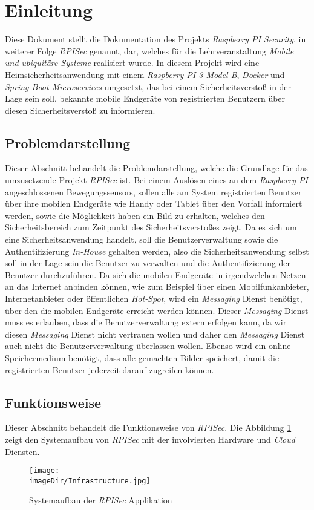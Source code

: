 \section{Einleitung}
Diese Dokument stellt die Dokumentation des Projekts \emph{Raspberry PI Security}, in weiterer Folge \emph{RPISec} genannt, dar, welches für die Lehrveranstaltung \emph{Mobile und ubiquitäre Systeme} realisiert wurde. In diesem Projekt wird eine Heimsicherheitsanwendung mit einem \emph{Raspberry PI 3 Model B}, \emph{Docker} und \emph{Spring Boot Microservices} umgesetzt, das bei einem Sicherheitsverstoß in der Lage sein soll, bekannte mobile Endgeräte von registrierten Benutzern über diesen Sicherheitsverstoß zu informieren. 

\subsection{Problemdarstellung}
Dieser Abschnitt behandelt die Problemdarstellung, welche die Grundlage für das umzusetzende Projekt \emph{RPISec} ist. Bei einem Auslösen eines an dem \emph{Raspberry PI} angeschlossenen Bewegungssensors,  sollen alle am System registrierten Benutzer über ihre mobilen Endgeräte wie Handy oder Tablet über den Vorfall informiert werden, sowie die Möglichkeit haben ein Bild zu erhalten, welches den Sicherheitsbereich zum Zeitpunkt des Sicherheitsverstoßes zeigt. 
\newline
\newline
Da es sich um eine Sicherheitsanwendung handelt, soll die Benutzerverwaltung sowie die Authentifizierung \emph{In-House} gehalten werden, also die Sicherheitsanwendung selbst soll in der Lage sein die Benutzer zu verwalten und die Authentifizierung der Benutzer durchzuführen. Da sich die mobilen Endgeräte in irgendwelchen Netzen an das Internet anbinden können, wie zum Beispiel über einen Mobilfunkanbieter, Internetanbieter oder öffentlichen \emph{Hot-Spot}, wird ein \emph{Messaging} Dienst benötigt, über den die mobilen Endgeräte erreicht werden können. Dieser \emph{Messaging} Dienst muss es erlauben, dass die Benutzerverwaltung extern erfolgen kann, da wir diesen \emph{Messaging} Dienst nicht vertrauen wollen und daher den \emph{Messaging} Dienst auch nicht die Benutzerverwaltung überlassen wollen. Ebenso wird ein online Speichermedium benötigt, dass alle gemachten Bilder speichert, damit die registrierten Benutzer jederzeit darauf zugreifen können.


\subsection{Funktionsweise}
Dieser Abschnitt behandelt die Funktionsweise von \emph{RPISec}. Die Abbildung \ref{fig:image-system-structure} zeigt den Systemaufbau von \emph{RPISec} mit der involvierten Hardware und \emph{Cloud} Diensten. 
\begin{figure}[h]
	\centering
	\texttt{[image: \\imageDir/Infrastructure.jpg]}
	\caption{Systemaufbau der \emph{RPISec} Applikation}
	\label{fig:image-system-structure}
\end{figure}
\ \newpage

